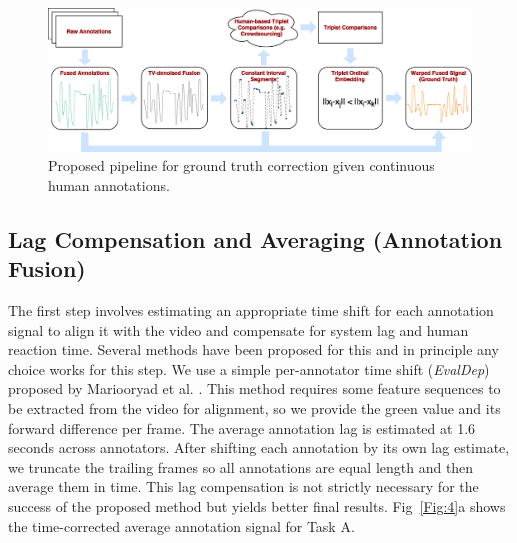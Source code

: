 \documentclass[10pt,letterpaper]{article}
\def \imagewidth {7.5in}
\begin{document}
\begin{figure}[t]
    \begin{adjustwidth}{-2.25in}{0in}
	\centering
	\includegraphics[width=\imagewidth]{images/Fig3.eps}
	\caption{Proposed pipeline for ground truth correction given continuous human annotations.}
	\label{Fig:pipeline}
	\end{adjustwidth}
\end{figure}

\subsection*{Lag Compensation and Averaging (Annotation Fusion)}
The first step involves estimating an appropriate time shift for each annotation signal to align it with the video and compensate for system lag and human reaction time.  Several methods have been proposed for this \cite{DTW2007, CTW2009, andrew2013deep, nicolaou2014dynamic, Mariooryad2015, Ringeval2015, trigeorgis2016deep} and in principle any choice works for this step.  We use a simple per-annotator time shift (\textit{EvalDep}) proposed by Mariooryad et al. \cite{Mariooryad2015}.  This method requires some feature sequences to be extracted from the video for alignment, so we provide the green value and its forward difference per frame.  The average annotation lag is estimated at 1.6 seconds across annotators.  After shifting each annotation by its own lag estimate, we truncate the trailing frames so all annotations are equal length and then average them in time. This lag compensation is not strictly necessary for the success of the proposed method but yields better final results. Fig~\ref{Fig:4}a shows the time-corrected average annotation signal for Task A.
\end{document}
